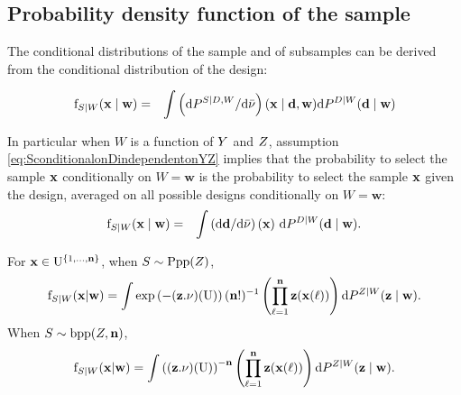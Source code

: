 \subsection{Probability density function of the sample}

The conditional distributions of the sample and of subsamples can be derived from  the conditional distribution of the design:

\begin{eqnarray}
\mathrm{f}_{S\mid W}(\mathbf{x}\mid\mathbf{w})&=&
\int \left(\mathrm{d} P^{S\mid D,W}/\mathrm{d}\bar{\nu} \right)(\mathbf{x}\mid \mathbf{d},\mathbf{w})\mathrm{d} P^{D\mid W}(\mathbf{d}\mid\mathbf{w})
\end{eqnarray}

In particular when $W$ is a function of $Y$ and $Z$, assumption \eqref{eq:SconditionalonDindependentonYZ} implies that the probability to select the sample $\mathbf{x}$ conditionally on $W=\mathbf{w}$ is the 
probability to select the sample $\mathbf{x}$ given the design, averaged on all possible designs conditionally on  $W=\mathbf{w}$:
\begin{eqnarray}
\mathrm{f}_{S\mid W}(\mathbf{x}\mid\mathbf{w})&=&
\int \left(\mathrm{d} \mathbf{d}/\mathrm{d}\bar{\nu} \right)(\mathbf{x})~\mathrm{d} P^{D\mid W}(\mathbf{d}\mid\mathbf{w}).
\end{eqnarray}

\begin{example}
\label{example:2.3}
 For $\mathbf{x}\in\mathrm{U}^{\{1,\ldots,\mathbf{n}\}}$, when $S\sim \mathrm{Ppp}(Z)$,
\begin{equation}\mathrm{f}_{S\mid W}(\mathbf{x}|\mathbf{w})=
\int\exp\left(-(\mathbf{z}.\nu)(\mathrm{U})\right)(\mathbf{n}!)^{-1}\left(\prod_{\ell=1}^{\mathbf{n}} \mathbf{z}(\mathbf{x}(\ell))\right)\mathrm{d}
P^{Z\mid W}(\mathbf{z}\mid \mathbf{w}).\label{eq:oijoijejods}
\end{equation}
When $S\sim \mathrm{bpp}(Z,\mathbf{n})$,
\begin{equation}
\mathrm{f}_{S\mid W}(\mathbf{x}|\mathbf{w})=
\int\left((\mathbf{z}.\nu)(\mathrm{U})\right)^{-\mathbf{n}}\left(\prod_{\ell=1}^{\mathbf{n}} \mathbf{z}(\mathbf{x}(\ell))\right)\mathrm{d}
P^{Z\mid W}(\mathbf{z}\mid \mathbf{w}).\label{eq:oijerogiql}
\end{equation}
\end{example}




